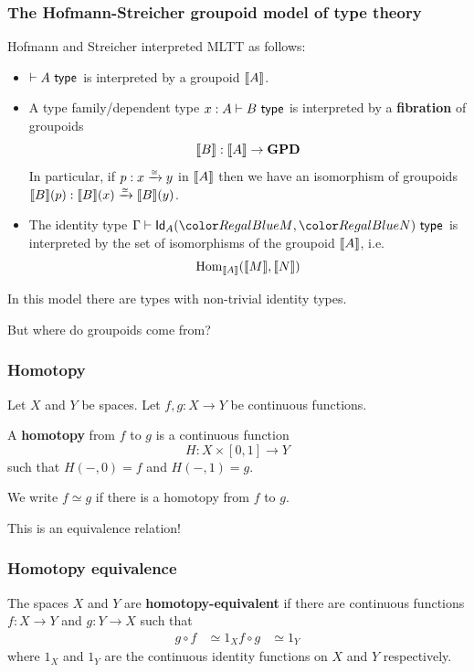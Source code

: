 \documentclass[handout]{beamer} %
\begin{document}
\begin{frame}
  \frametitle{The Hofmann-Streicher groupoid model of type theory}
  
  Hofmann and Streicher interpreted MLTT as follows:
  \begin{itemize}
    \item $\IsTy[]{A}[]$ is interpreted by a groupoid $\llbracket A \rrbracket$.
    \item A type family/dependent type $\IsTy[x : A]{B}[]$ is interpreted by a \textbf{fibration} of groupoids
    \[
      \llbracket B \rrbracket : \llbracket A \rrbracket \to \mathbf{GPD}
    \]
    In particular, if $p : x \xrightarrow{\tiny \cong} y$ in $\llbracket A \rrbracket$ then we have an isomorphism of groupoids $\llbracket B \rrbracket(p) : \llbracket B \rrbracket(x) \xrightarrow{\tiny \cong} \llbracket B \rrbracket(y)$.

    \medskip

    \item The identity type $\IsTy{\Id{A}{M}{N}}[]$ is interpreted by the set of isomorphisms of the groupoid $\llbracket A \rrbracket$, i.e.
    \[
      \Hom[\Interp{A}]{\Interp{M}}{\Interp{N}}
    \]
  \end{itemize}

  \medskip

  In this model there are types with non-trivial identity types.

  \medskip
  
  But where do groupoids come from?
\end{frame}

\begin{frame}
  \frametitle{Homotopy}

  Let $X$ and $Y$ be spaces. Let $f, g : X \to Y$ be continuous functions.

  \begin{definition}
    A \textbf{homotopy} from $f$ to $g$ is a continuous function
    \[
      H : X \times [0, 1] \to Y
    \]
    such that $H(-, 0) = f$ and $H(-, 1) = g$.
  \end{definition}
  
  We write $f \simeq g$ if there is a homotopy from $f$ to $g$.

  This is an equivalence relation!
\end{frame}

\begin{frame}
  \frametitle{Homotopy equivalence}

  \begin{definition}
    The spaces $X$ and $Y$ are \textbf{homotopy-equivalent} if
    there are continuous functions $f : X \to Y$ and $g : Y \to X$ such that
    \begin{align*}
      g \circ f &\simeq 1_X 
      f \circ g &\simeq 1_Y
    \end{align*}
    where $1_X$ and $1_Y$ are the continuous identity functions on $X$ and $Y$
    respectively.
  \end{definition}
\end{frame}
\end{document}
